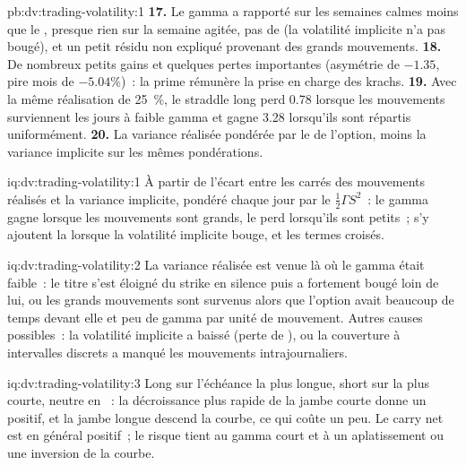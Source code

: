 \begin{solution}{pb:dv:trading-volatility:1}
\textbf{17.} Le gamma a rapporté sur les semaines calmes moins que le , presque rien sur la semaine agitée, pas de  (la volatilité implicite n'a pas bougé), et un petit résidu
non expliqué provenant des grands mouvements.
\textbf{18.} De nombreux petits gains et quelques pertes importantes (asymétrie de $-1.35$, pire mois de $-5.04\%$)~: la prime rémunère la prise en charge des krachs.
\textbf{19.} Avec la même réalisation de 25~\%, le straddle long perd 0.78 lorsque les mouvements surviennent les jours à faible gamma et gagne 3.28 lorsqu'ils sont répartis uniformément.
\textbf{20.} La variance réalisée pondérée par le  de l'option, moins la variance implicite sur les mêmes pondérations.
\end{solution}

\begin{solution}{iq:dv:trading-volatility:1}
À partir de l'écart entre les carrés des mouvements réalisés et la variance implicite, pondéré chaque jour par le  $\frac12\Gamma S^2$~: le gamma gagne lorsque les
mouvements sont grands, le  perd lorsqu'ils sont petits~; s'y ajoutent la  lorsque la volatilité implicite bouge, et les termes croisés.
\end{solution}

\begin{solution}{iq:dv:trading-volatility:2}
La variance réalisée est venue là où le gamma était faible~: le titre s'est éloigné du strike en silence puis a fortement bougé loin de lui, ou les grands mouvements sont survenus alors
que l'option avait beaucoup de temps devant elle et peu de gamma par unité de mouvement. Autres causes possibles~: la volatilité implicite a baissé (perte de ), ou la couverture à intervalles discrets a manqué
les mouvements intrajournaliers.
\end{solution}

\begin{solution}{iq:dv:trading-volatility:3}
Long sur l'échéance la plus longue, short sur la plus courte, neutre en ~: la décroissance plus rapide de la jambe courte donne un  positif, et la jambe longue descend la courbe, ce qui coûte un
peu. Le carry net est en général positif~; le risque tient au gamma court et à un aplatissement ou une inversion de la courbe.
\end{solution}

